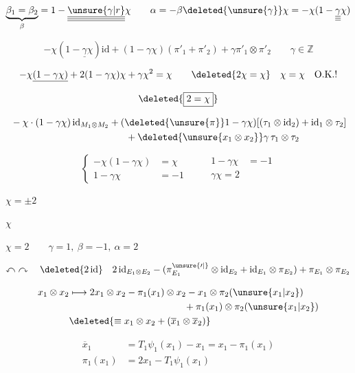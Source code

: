 \[
\underbrace{\beta_1=\beta_2}_{\beta}=1-\underline{\underline{\underline{\unsure{\gamma|r}}}}\chi
\qquad \alpha=-\beta\deleted{\unsure{\gamma}}\chi=-\chi(1-\underline{\underline{\underline{\gamma}}}\chi)
\]

\[
-\chi(1-\underline{\gamma}\chi)\mathrm{id}+(1-\gamma\chi)(\pi'_1+\pi'_2)+\gamma\pi'_1\otimes\pi'_2
\qquad\gamma\in\mathbb Z
\]

\[
-\chi\underline{(1-\gamma\chi)}+2(1-\gamma\chi)\chi+\gamma\chi^2=\chi
\qquad\deleted{2\chi=\chi}\quad\chi=\chi\quad\text{O.K.!}
\]

\[\deleted{\boxed{2=\chi}}\]

\[
\begin{aligned}
&-\chi\cdot(1-\gamma\chi)\,\mathrm{id}_{M_1\otimes M_2}
+(\deleted{\unsure{\pi}}1-\gamma\chi)[(\tau_1\otimes\mathrm{id}_2)+\mathrm{id}_1\otimes\tau_2]\\
&\hspace{12em}+\deleted{\unsure{x_1\otimes x_2}}\gamma\,\tau_1\otimes\tau_2
\end{aligned}
\]

\[
\left\{\begin{aligned}-\chi(1-\gamma\chi)&=\chi\\1-\gamma\chi&=-1\end{aligned}\right.
\qquad
\begin{aligned}1-\gamma\chi&=-1\\\boxed{\gamma\chi=2}\end{aligned}
\]

 $\chi=\pm2$

 $\chi$ \deleted{$\unsure{\chi}$}

$\chi=2\qquad\gamma=1,\ \beta=-1,\ \alpha=2$ 

\[
\curvearrowleft\ \curvearrowright\quad\deleted{2\,\mathrm{id}}\quad
2\,\mathrm{id}_{E_1\otimes E_2}-
(\pi_{E_1}^{\unsure{\prime|}}\otimes\mathrm{id}_{E_2}+\mathrm{id}_{E_1}\otimes\pi_{E_2})
+\pi_{E_1}\otimes\pi_{E_2}
\]

\[
\begin{aligned}
x_1\otimes x_2&\longmapsto 2x_1\otimes x_2-\pi_1(x_1)\otimes x_2-x_1\otimes\pi_2(\unsure{x_1|x_2})\\
&\hspace{12em}+\pi_1(x_1)\otimes\pi_2(\unsure{x_1|x_2})\\
&\deleted{\equiv x_1\otimes x_2+(\overline{x}_1\otimes\overline{x}_2)}
\end{aligned}
\]

\[
\begin{aligned}
\overline{x}_1&=T_1\psi_1(x_1)-x_1=x_1-\pi_1(x_1)\\
\pi_1(x_1)&=2x_1-T_1\psi_1(x_1)
\end{aligned}
\]
